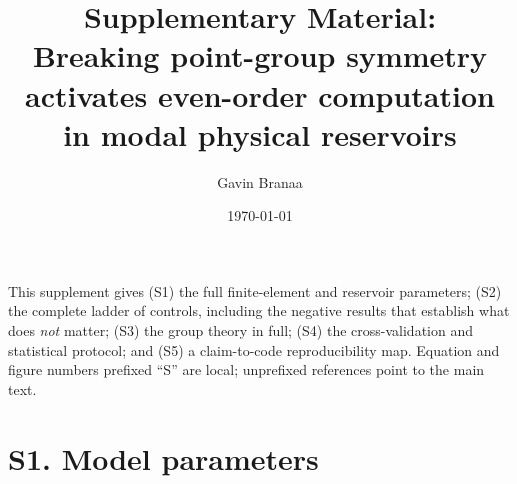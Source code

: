 \documentclass[aps,prapplied,reprint,amsmath,amssymb,floatfix]{revtex4-2}
\begin{document}
\title{Supplementary Material:\\
Breaking point-group symmetry activates even-order computation\\
in modal physical reservoirs}
\author{Gavin Branaa}
\date{\today}
\maketitle

This supplement gives (S1) the full finite-element and reservoir parameters;
(S2) the complete ladder of controls, including the negative results that
establish what does \emph{not} matter; (S3) the group theory in full; (S4) the
cross-validation and statistical protocol; and (S5) a claim-to-code
reproducibility map. Equation and figure numbers prefixed ``S'' are local;
unprefixed references point to the main text.

\section{S1. Model parameters}
\end{document}
